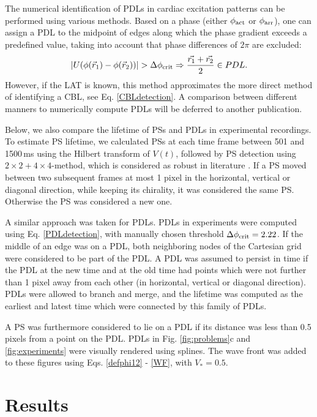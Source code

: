 \documentclass{article}
\newcommand{\phiact}{\ensuremath{\phi_{\rm act}}}
\newcommand{\phiarr}{\ensuremath{\phi_{\rm arr}}}
\newcommand{\VS}{V_*}
\begin{document}
The numerical identification of PDLs in cardiac excitation patterns can be performed using various methods. Based on a phase (either $\phiact$ or $\phiarr$), one can assign a PDL to the midpoint of edges along which the phase gradient exceeds a predefined value, taking into account that phase differences of $2\pi$ are excluded: 
\begin{align}
| U( \phi(\vec{r}_1) - \phi(\vec{r}_2)) | > \Delta\phi_{\rm crit}     \Rightarrow \frac{\vec{r_1} + \vec{r_2}}{2} \in PDL.  \label{PDLdetection}
\end{align}
However, if the LAT is known, this method approximates the more direct method of identifying a CBL, see Eq. \eqref{CBLdetection}. A comparison between different manners to numerically compute PDLs will be deferred to another publication. 

Below, we also compare the lifetime of PSs and PDLs in experimental recordings. To estimate PS lifetime, we calculated PSs at each time frame between 501 and 1500\,ms using the Hilbert transform of $V(t)$, followed by PS detection using $2\times2+4\times4$-method, which is considered as robust in literature \citep{Kuklik:2017}. If a PS moved between two subsequent frames at most 1 pixel in the horizontal, vertical or diagonal direction, while keeping its chirality, it was considered the same PS. Otherwise the PS was considered a new one. 

A similar approach was taken for PDLs. PDLs in experiments were computed using Eq. \eqref{PDLdetection}, with manually chosen threshold $\Delta\phi_{\rm crit} = 2.22$. If the middle of an edge was on a PDL, both neighboring nodes of the Cartesian grid were considered to be part of the PDL. A PDL was assumed to persist in time if the PDL at the new time and at the old time had points which were not further than 1 pixel away from each other (in horizontal, vertical or diagonal direction). PDLs were allowed to branch and merge, and the lifetime was computed as the earliest and latest time which were connected by this family of PDLs. 

A PS was furthermore considered to lie on a PDL if its distance was less than 0.5 pixels from a point on the PDL. PDLs in Fig. \ref{fig:problems}c and \ref{fig:experiments} were visually rendered using splines. The wave front was added to these figures using Eqs. \eqref{defphi12} - \eqref{WF}, with $\VS = 0.5$.

\section{Results}\label{sec:results}
\end{document}
